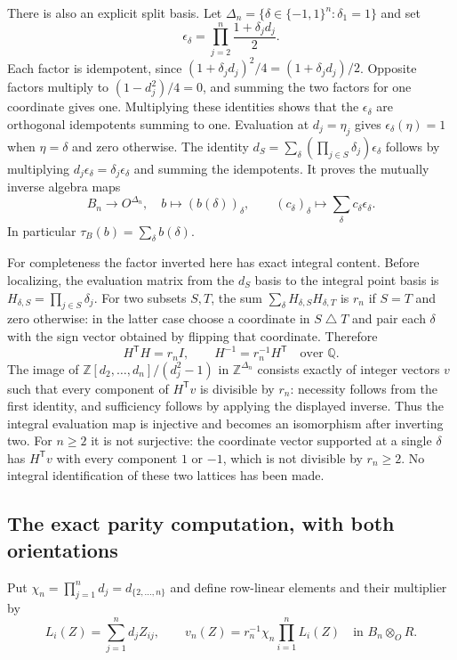 There is also an explicit split basis. Let
$\Delta_n=\{\delta\in\{-1,1\}^n:\delta_1=1\}$ and set
\[
 \epsilon_\delta=\prod_{j=2}^n\frac{1+\delta_jd_j}{2}.
\]
Each factor is idempotent, since
$(1+\delta_jd_j)^2/4=(1+\delta_jd_j)/2$.
Opposite factors multiply to $(1-d_j^2)/4=0$, and summing the
two factors for one coordinate gives one. Multiplying these identities
shows that the $\epsilon_\delta$ are orthogonal idempotents summing
to one. Evaluation at $d_j=\eta_j$ gives
$\epsilon_\delta(\eta)=1$ when $\eta=\delta$ and zero otherwise.
The identity
$d_S=\sum_\delta(\prod_{j\in S}\delta_j)\epsilon_\delta$
follows by multiplying $d_j\epsilon_\delta=\delta_j\epsilon_\delta$
and summing the idempotents. It proves the mutually inverse algebra maps
\[
 B_n\longrightarrow O^{\Delta_n},\quad b\longmapsto(b(\delta))_\delta,
 \qquad(c_\delta)_\delta\longmapsto\sum_\delta c_\delta\epsilon_\delta.
\]
In particular $\tau_B(b)=\sum_\delta b(\delta)$.

For completeness the factor inverted here has exact integral content.
Before localizing, the evaluation matrix from the $d_S$ basis to
the integral point basis is
$H_{\delta,S}=\prod_{j\in S}\delta_j$. For two subsets $S,T$,
the sum $\sum_\delta H_{\delta,S}H_{\delta,T}$ is $r_n$ if
$S=T$ and zero otherwise: in the latter case choose a coordinate
in $S\mathbin{\triangle}T$ and pair each $\delta$ with the sign
vector obtained by flipping that coordinate. Therefore
\[
 H^{\mathsf T}H=r_n I,\qquad H^{-1}=r_n^{-1}H^{\mathsf T}
 \quad\text{over }\mathbb Q.
\]
The image of $\mathbb Z[d_2,\ldots,d_n]/(d_j^2-1)$ in
$\mathbb Z^{\Delta_n}$ consists exactly of integer vectors $v$
such that every component of $H^{\mathsf T}v$ is divisible by $r_n$:
necessity follows from the first identity, and sufficiency follows
by applying the displayed inverse. Thus the integral evaluation map
is injective and becomes an isomorphism after inverting two. For
$n\ge2$ it is not surjective: the coordinate vector supported at
a single $\delta$ has $H^{\mathsf T}v$ with every component $1$
or $-1$, which is not divisible by $r_n\ge2$.
No integral identification of these two lattices has been made.

\subsection{The exact parity computation, with both orientations}

Put $\chi_n=\prod_{j=1}^n d_j=d_{\{2,\ldots,n\}}$ and define
row-linear elements and their multiplier by
\begin{equation}\label{eq:compressed-row-multiplier}
 L_i(Z)=\sum_{j=1}^n d_j Z_{ij},\qquad
 v_n(Z)=r_n^{-1}\chi_n\prod_{i=1}^n L_i(Z)
 \quad\text{in }B_n\otimes_O R.
\end{equation}

